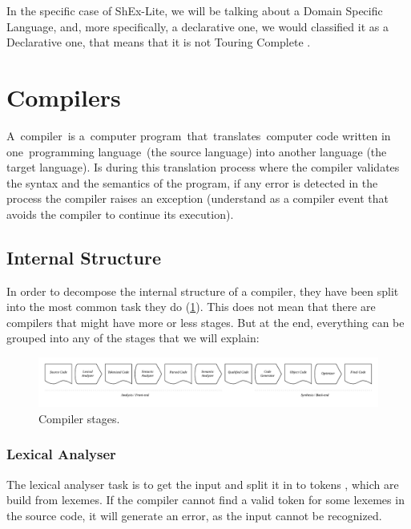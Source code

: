 In the specific case of ShEx-Lite, we will be talking about a Domain Specific Language, and, more specifically, a declarative one, we would classified
it as a Declarative one, that means that it is not Touring Complete \cite{touring-complete}.


\section{Compilers}
A compiler is a computer program that translates computer code written in one programming language (the source language)
into another language (the target language). Is during this translation process where the compiler validates the syntax
and the semantics of the program, if any error is detected in the process the compiler raises an exception (understand
as a compiler event that avoids the compiler to continue its execution).

\subsection{Internal Structure}
In order to decompose the internal structure of a compiler, they have been split into the most common task they do
(\cref{fig:compiler-stages}). This does not mean that there are compilers that might have more or less stages. But at the
end, everything can be grouped into any of the stages that we will explain:

\begin{figure}
  \includegraphics[width=\textwidth]{images/compiler-stages.pdf}
  \centering
  \caption[Compiler stages]{Compiler stages.}
  \label{fig:compiler-stages}
\end{figure}

\subsubsection{Lexical Analyser}
The lexical analyser task is to get the input and split it in to tokens \cite{lexical-analysis}, which are build
from lexemes. If the compiler cannot find a valid token for some lexemes in the source code, it will generate an error,
as the input cannot be recognized.

